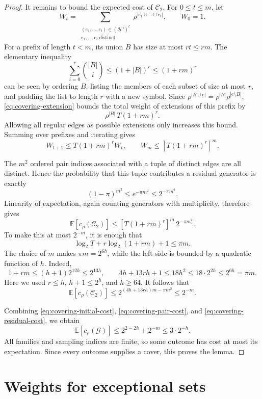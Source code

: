 \documentclass[11pt,letterpaper]{article}
\theoremstyle{definition}
\theoremstyle{remark}
\numberwithin{equation}{section}
\begin{document}
\begin{proof}
It remains to bound the expected cost of \(\mathcal C_2\). For
\(0\le t\le m\), let
\[
W_t=
\sum_{\substack{(e_1,\ldots,e_t)\in(\mathcal H')^t\\
                e_1,\ldots,e_t\ \text{distinct}}}
  \rho^{|e_1\cup\cdots\cup e_t|},
\qquad W_0=1.
\]
For a prefix of length \(t<m\), its union \(B\) has size at most \(rt\le rm\).
The elementary inequality
\[
\sum_{i=0}^r\binom{|B|}{i}\le(1+|B|)^r\le(1+rm)^r
\]
can be seen by ordering \(B\), listing the members of each subset of size
at most \(r\), and padding the list to length \(r\) with a new symbol.
Since
\(\rho^{|B\cup e|}=\rho^{|B|}\rho^{|e\setminus B|}\),
\eqref{eq:covering-extension} bounds the total weight of extensions of
this prefix by
\[
\rho^{|B|}\,T(1+rm)^r.
\]
Allowing all regular edges as possible extensions only increases this
bound. Summing over prefixes and iterating gives
\[
W_{t+1}\le T(1+rm)^rW_t,
\qquad
W_m\le[T(1+rm)^r]^m.
\]

The \(m^2\) ordered pair indices associated with a tuple of distinct
edges are all distinct. Hence the probability that this tuple contributes
a residual generator is exactly
\[
(1-\pi)^{m^2}\le e^{-\pi m^2}\le2^{-\pi m^2}.
\]
Linearity of expectation, again counting generators with multiplicity,
therefore gives
\[
\mathbb E[c_\rho(\mathcal C_2)]
\le[T(1+rm)^r]^m\,2^{-\pi m^2}.
\]
To make this at most \(2^{-m}\), it is enough that
\[
\log_2 T+r\log_2(1+rm)+1\le\pi m.
\]
The choice of \(m\) makes \(\pi m=2^{6h}\), while the left side
is bounded by a quadratic function of \(h\). Indeed,
\[
1+rm\le(h+1)2^{12h}\le2^{13h},
\qquad
4h+13rh+1\le18h^2
\le18\cdot2^{2h}\le2^{6h}=\pi m.
\]
Here we used \(r\le h\), \(h+1\le2^h\), and \(h\ge64\).
It follows that
\begin{equation}\label{eq:covering-residual-cost}
\mathbb E[c_\rho(\mathcal C_2)]
\le2^{(4h+13rh)m-\pi m^2}\le2^{-m}.
\end{equation}

Combining \eqref{eq:covering-initial-cost},
\eqref{eq:covering-pair-cost}, and
\eqref{eq:covering-residual-cost}, we obtain
\[
\mathbb E[c_\rho(\mathcal G)]
\le2^{2-2h}+2^{-m}\le3\cdot2^{-h}.
\]
All families and sampling indices are finite, so some outcome has cost
at most its expectation. Since every outcome supplies a cover, this proves
the lemma.
\end{proof}

\section{Weights for exceptional sets}
\label{sec:weights}
\end{document}
